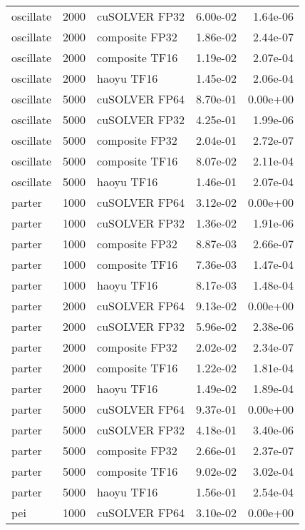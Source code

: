 \begin{table}
\begin{tabular}{lrlrr}
oscillate &  2000 &  cuSOLVER FP32 &  6.00e-02 &        1.64e-06 \\
oscillate &  2000 & composite FP32 &  1.86e-02 &        2.44e-07 \\
oscillate &  2000 & composite TF16 &  1.19e-02 &        2.07e-04 \\
oscillate &  2000 &     haoyu TF16 &  1.45e-02 &        2.06e-04 \\
oscillate &  5000 &  cuSOLVER FP64 &  8.70e-01 &        0.00e+00 \\
oscillate &  5000 &  cuSOLVER FP32 &  4.25e-01 &        1.99e-06 \\
oscillate &  5000 & composite FP32 &  2.04e-01 &        2.72e-07 \\
oscillate &  5000 & composite TF16 &  8.07e-02 &        2.11e-04 \\
oscillate &  5000 &     haoyu TF16 &  1.46e-01 &        2.07e-04 \\
   parter &  1000 &  cuSOLVER FP64 &  3.12e-02 &        0.00e+00 \\
   parter &  1000 &  cuSOLVER FP32 &  1.36e-02 &        1.91e-06 \\
   parter &  1000 & composite FP32 &  8.87e-03 &        2.66e-07 \\
   parter &  1000 & composite TF16 &  7.36e-03 &        1.47e-04 \\
   parter &  1000 &     haoyu TF16 &  8.17e-03 &        1.48e-04 \\
   parter &  2000 &  cuSOLVER FP64 &  9.13e-02 &        0.00e+00 \\
   parter &  2000 &  cuSOLVER FP32 &  5.96e-02 &        2.38e-06 \\
   parter &  2000 & composite FP32 &  2.02e-02 &        2.34e-07 \\
   parter &  2000 & composite TF16 &  1.22e-02 &        1.81e-04 \\
   parter &  2000 &     haoyu TF16 &  1.49e-02 &        1.89e-04 \\
   parter &  5000 &  cuSOLVER FP64 &  9.37e-01 &        0.00e+00 \\
   parter &  5000 &  cuSOLVER FP32 &  4.18e-01 &        3.40e-06 \\
   parter &  5000 & composite FP32 &  2.66e-01 &        2.37e-07 \\
   parter &  5000 & composite TF16 &  9.02e-02 &        3.02e-04 \\
   parter &  5000 &     haoyu TF16 &  1.56e-01 &        2.54e-04 \\
      pei &  1000 &  cuSOLVER FP64 &  3.10e-02 &        0.00e+00 \\

\end{tabular}
\end{table}
